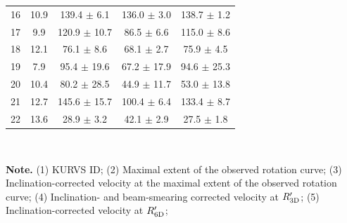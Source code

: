 \begin{table}
\begin{tabular}{ccccc}
  16   &    10.9 &    139.4  $\pm$  6.1  &    136.0  $\pm$  3.0   &     138.7  $\pm$  1.2         \\  
  17   &    9.9  &    120.9  $\pm$  10.7 &    86.5   $\pm$  6.6   &     115.0  $\pm$  8.6         \\  
  18   &    12.1 &    76.1   $\pm$  8.6  &    68.1   $\pm$  2.7   &     75.9   $\pm$  4.5         \\  
  19   &    7.9  &    95.4   $\pm$  19.6 &    67.2   $\pm$  17.9  &     94.6   $\pm$  25.3        \\  
  20   &    10.4 &    80.2   $\pm$  28.5 &    44.9   $\pm$  11.7  &     53.0   $\pm$  13.8        \\  
  21   &    12.7 &    145.6  $\pm$  15.7 &    100.4  $\pm$  6.4   &     133.4  $\pm$  8.7         \\  
  22   &    13.6 &    28.9   $\pm$  3.2  &    42.1   $\pm$  2.9   &     27.5   $\pm$  1.8         \\  
\hline
\hline
\end{tabular}
\\[2mm] 
\begin{flushleft}
{\bf Note.} 
(1) KURVS ID;
(2) Maximal extent of the observed rotation curve;
(3) Inclination-corrected velocity at the maximal extent of the observed rotation curve;
(4) Inclination- and beam-smearing corrected velocity at $R'_{\rm 3D}$;
(5) Inclination-corrected velocity at $R'_{\rm 6D}$;
\end{flushleft}
\end{table}
